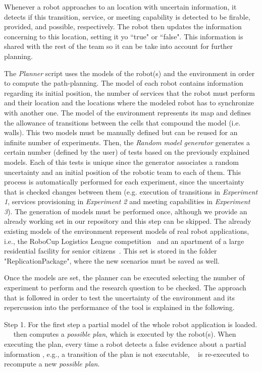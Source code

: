 Whenever a robot approaches to an location with uncertain information, it detects if this transition, service, or meeting capability is detected to be firable, provided, and possible, respectively.
The robot then updates the information concerning to this location, setting it yo ``true" or ``false".
This information is shared with the rest of the team so it can be take into account for further planning.


The \emph{Planner} script uses the models of the robot(s) and the environment in order to compute the path-planning.
The model of each robot contains information regarding its initial position, the number of services that the robot must perform and their location and the locations where the modeled robot has to synchronize with another one.  
The model of the environment represents its map and defines the allowance of transitions between the cells that compound the model (i.e. walls). 
This two models must be manually defined but can be reused for an infinite number of experiments.
Then, the \emph{Random model generator} generates a certain number (defined by the user) of tests based on the previously explained models.
Each of this tests is unique since the generator associates a random uncertainty and an initial position of the robotic team to each of them.
This process is automatically performed for each experiment, since the uncertainty that is checked changes between them (e.g. execution of transitions in \emph{Experiment 1}, services provisioning in \emph{Experiment 2} and meeting capabilities in \emph{Experiment 3}).
The generation of models must be performed once, although we provide an already working set in our repository and this step can be skipped.
The already existing models of the environment represent models of real robot applications, i.e., the RoboCup Logistics League competition~\cite{karrasrobocup} and an apartment of a large residential facility for senior citizens~\cite{map}.
This set is stored in the folder "ReplicationPackage", where the new scenarios must be saved as well.

Once the models are set, the planner can be executed selecting the number of experiment to perform and the research question to be checked.
The approach that is followed in order to test the uncertainty of the environment and its repercussion into the performance of the tool is explained in the following.

Step 1. For the first step a partial model of the whole robot application is loaded. 
~\toolName~ then computes a \emph{possible plan}, which is executed by the robot(s).
When executing the plan, every time a robot detects a false evidence about a partial information , e.g., a transition of the plan is not executable, \toolName~ is re-executed to recompute a new \emph{possible plan}.

